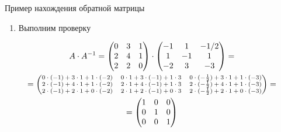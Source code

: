 \documentclass[unicode,11pt,notheorems]{beamer}
\begin{document}
\begin{frame}{Пример нахождения обратной матрицы}{}
\begin{enumerate}
\framebreak	
\item 
	Выполним проверку
\end{enumerate}	
	\begin{multline*}
		A\cdot A^{-1}
		=\begin{pmatrix}
			0 & 3 & 1 \\
			2 & 4 & 1 \\
			2 & 2 & 0 \\
		\end{pmatrix}
		\cdot
		\begin{pmatrix}
			-1 & 1 & -1/2\\
			1 & -1 & 1\\
			-2 & 3 & -3\\
		\end{pmatrix}
		=\\
		={\scriptsize\begin{pmatrix}
			0\cdot(-1)+3\cdot 1+1\cdot(-2) & 0\cdot 1+3\cdot (-1)+1\cdot 3 & 0\cdot (-\frac{1}{2})+3\cdot 1+1\cdot(-3) \\
			2\cdot(-1)+4\cdot 1+1\cdot(-2) & 2\cdot 1+4\cdot (-1)+1\cdot 3 & 2\cdot (-\frac{1}{2})+4\cdot 1+1\cdot(-3) \\
			2\cdot(-1)+2\cdot 1+0\cdot(-2) & 2\cdot 1+2\cdot (-1)+0\cdot 3 & 2\cdot (-\frac{1}{2})+2\cdot 1+0\cdot(-3) \\
		\end{pmatrix}
		}
		=\\
		=
		\begin{pmatrix}
			1 & 0 & 0\\
			0 & 1 & 0\\
			0 & 0 & 1\\
		\end{pmatrix}
	\end{multline*}

\end{frame}
\end{document}
